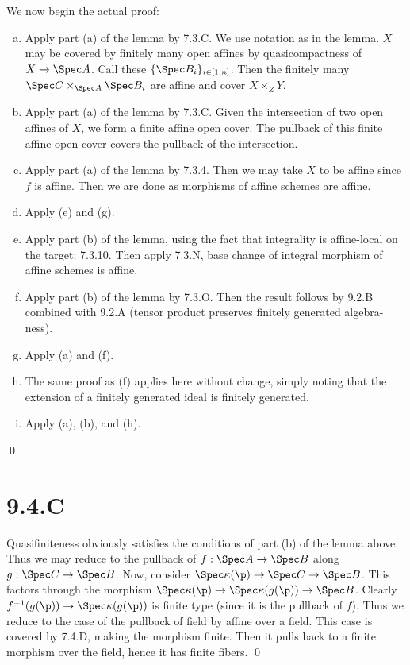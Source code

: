 \documentclass{article}
\begin{document}
We now begin the actual proof:
\begin{enumerate}[a.]
    \item Apply part (a) of the lemma by 7.3.C. We use notation as in the lemma.
          $X$ may be covered by finitely many open affines by
          quasicompactness of $X \to \Spec A$. Call these $\{\Spec B_i\}_{i \in [1, n]}$.
          Then the finitely many $\Spec C \times_{\Spec A} \Spec B_i$ are affine and cover
          $X \times_ZY$.

    \item Apply part (a) of the lemma by 7.3.C. Given the intersection of two open
          affines of $X$, we form a finite affine open cover. The
          pullback of this finite affine open cover covers the pullback of the
          intersection.
    \item Apply part (a) of the lemma by 7.3.4. Then we may take $X$
          to be affine since $f$ is affine. Then we are done as
          morphisms of affine schemes are affine.
    \item Apply (e) and (g).
    \item Apply part (b) of the lemma, using the fact that integrality is affine-local on
          the target: 7.3.10. Then apply 7.3.N, base change of integral morphism of
          affine schemes is affine.
    \item Apply part (b) of the lemma by 7.3.O. Then the result follows by 9.2.B combined
          with 9.2.A (tensor product preserves finitely generated algebra-ness).
    \item Apply (a) and (f).
    \item The same proof as (f) applies here without change, simply noting that the
          extension of a finitely generated ideal is finitely generated.
    \item Apply (a), (b), and (h).
\end{enumerate} \qed

\section{9.4.C}
Quasifiniteness obviously satisfies the conditions of part (b) of the lemma
above. Thus we may reduce to the pullback of $f: \Spec A \to \Spec B$ along
$g: \Spec C \to \Spec B$. Now, consider $\Spec \kappa(\p) \to \Spec C \to \Spec B$. This factors
through the morphism $\Spec \kappa(\p) \to \Spec \kappa(g(\p)) \to \Spec B$. Clearly $f^{-1}(g(\p)) \to \Spec \kappa(g(\p))$
is finite type (since it is the pullback of $f$). Thus we
reduce to the case of the pullback of field by affine over a field. This case
is covered by 7.4.D, making the morphism finite. Then it pulls back to a finite
morphism over the field, hence it has finite fibers. \qed
\end{document}
